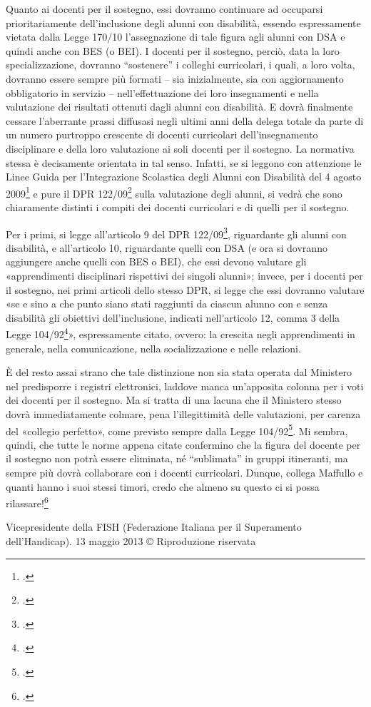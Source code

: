 Quanto ai docenti per il sostegno, essi dovranno continuare ad occuparsi prioritariamente dell'inclusione degli alunni con disabilità, essendo espressamente vietata dalla Legge 170/10 l'assegnazione di tale figura agli alunni con DSA e quindi anche con BES (o BEI).
I docenti per il sostegno, perciò, data la loro specializzazione, dovranno “sostenere” i colleghi curricolari, i quali, a loro volta, dovranno essere sempre più formati – sia inizialmente, sia con aggiornamento obbligatorio in servizio – nell'effettuazione dei loro insegnamenti e nella valutazione dei risultati ottenuti dagli alunni con disabilità. E dovrà finalmente cessare l'aberrante prassi diffusasi negli ultimi anni della delega totale da parte di un numero purtroppo crescente di docenti curricolari dell'insegnamento disciplinare e della loro valutazione ai soli docenti per il sostegno. La normativa stessa è decisamente orientata in tal senso. Infatti, se si leggono con attenzione le Linee Guida per l'Integrazione Scolastica degli Alunni con Disabilità del 4 agosto 2009\footcite{LineGuida2009} e pure il DPR 122/09\footcite{DPR_122_2009} sulla valutazione degli alunni, si vedrà che sono chiaramente distinti i compiti dei docenti curricolari e di quelli per il sostegno.

Per i primi, si legge all'articolo 9 del DPR 122/09\footcite{DPR_122_2009}, riguardante gli alunni con disabilità, e all'articolo 10, riguardante quelli con DSA (e ora si dovranno aggiungere anche quelli con BES o BEI), che essi devono valutare gli «apprendimenti disciplinari rispettivi dei singoli alunni»; invece, per i docenti per il sostegno, nei primi articoli dello stesso DPR, si legge che essi dovranno valutare «se e sino a che punto siano stati raggiunti da ciascun alunno con e senza disabilità gli obiettivi dell'inclusione, indicati nell'articolo 12, comma 3 della Legge 104/92\footcite{Legge_104_92}», espressamente citato, ovvero: la crescita negli apprendimenti in generale, nella comunicazione, nella socializzazione e nelle relazioni.

È del resto assai strano che tale distinzione non sia stata operata dal Ministero nel predisporre i registri elettronici, laddove manca un'apposita colonna per i voti dei docenti per il sostegno. Ma si tratta di una lacuna che il Ministero stesso dovrà immediatamente colmare, pena l'illegittimità delle valutazioni, per carenza del «collegio perfetto», come previsto sempre dalla Legge 104/92\footcite{Legge_104_92}.
Mi sembra, quindi, che tutte le norme appena citate confermino che la figura del docente per il sostegno non potrà essere eliminata, né “sublimata” in gruppi itineranti, ma sempre più dovrà collaborare con i docenti curricolari. Dunque, collega Maffullo e quanti hanno i suoi stessi timori, credo che almeno su questo ci si possa rilassare!\footcite{nocera3}


Vicepresidente della FISH (Federazione Italiana per il Superamento dell'Handicap).
13 maggio 2013
© Riproduzione riservata
